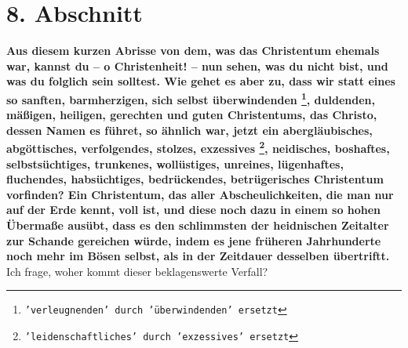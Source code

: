 \section{8. Abschnitt}  \label{kap2_ab8}

\textbf{Aus diesem kurzen Abrisse von dem, was das Christentum ehemals war,
kannst
du -- o Christenheit! -- nun sehen, was du nicht bist, und was du folglich sein
solltest. Wie gehet es aber zu, dass wir statt eines so sanften, barmherzigen,
sich selbst überwindenden
\footnote{\texttt{'verleugnenden' durch 'überwindenden' ersetzt}},
duldenden, mäßigen, heiligen, gerechten und guten Christentums, das Christo,
dessen Namen es führet, so ähnlich war, jetzt ein abergläubisches, abgöttisches,
verfolgendes, stolzes, exzessives
\footnote{\texttt{'leidenschaftliches' durch 'exzessives' ersetzt}},
neidisches, boshaftes, selbstsüchtiges,
trunkenes, wollüstiges, unreines, lügenhaftes, fluchendes, habsüchtiges,
bedrückendes, betrügerisches Christentum vorfinden? Ein Christentum, das aller
Abscheulichkeiten, die man nur auf der Erde kennt, voll ist, und diese noch dazu
in einem so hohen Übermaße ausübt, dass es den schlimmsten der heidnischen
Zeitalter zur Schande gereichen würde, indem es jene früheren Jahrhunderte noch
mehr im Bösen selbst, als in der Zeitdauer desselben übertriftt.} Ich frage,
woher kommt dieser beklagenswerte Verfall?

\medskip

